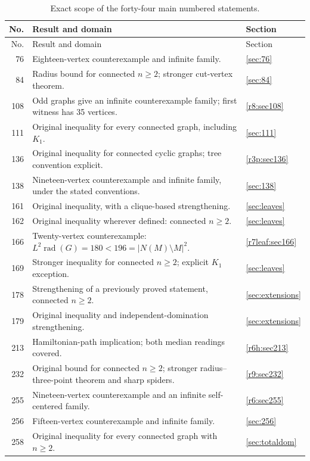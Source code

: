 \documentclass[11pt,a4paper]{article}
\theoremstyle{remark}
\newcommand{\rad}{\operatorname{rad}}
\begin{document}
\begin{longtable}{@{}r p{10.5cm} l@{}}
\caption{Exact scope of the forty-four main numbered statements.}
\label{tab:scope}\\
\toprule No. & Result and domain & Section\\\midrule
\endfirsthead
\toprule No. & Result and domain & Section\\\midrule
\endhead
76 & Eighteen-vertex counterexample and infinite family. & \ref{sec:76}\\
84 & Radius bound for connected $n\ge2$; stronger cut-vertex theorem. & \ref{sec:84}\\
108 & Odd graphs give an infinite counterexample family; first witness has 35 vertices. & \ref{r8:sec108}\\
111 & Original inequality for every connected graph, including $K_1$. & \ref{sec:111}\\
136 & Original inequality for connected cyclic graphs; tree convention explicit. & \ref{r3p:sec136}\\
138 & Nineteen-vertex counterexample and infinite family, under the stated conventions. & \ref{sec:138}\\
161 & Original inequality, with a clique-based strengthening. & \ref{sec:leaves}\\
162 & Original inequality wherever defined: connected $n\ge2$. & \ref{sec:leaves}\\
166 & Twenty-vertex counterexample: $L^2\rad(G)=180<196=|N(M)\setminus M|^2$. & \ref{r7leaf:sec166}\\
169 & Stronger inequality for connected $n\ge2$; explicit $K_1$ exception. & \ref{sec:leaves}\\
178 & Strengthening of a previously proved statement, connected $n\ge2$. & \ref{sec:extensions}\\
179 & Original inequality and independent-domination strengthening. & \ref{sec:extensions}\\
213 & Hamiltonian-path implication; both median readings covered. & \ref{r6h:sec213}\\
232 & Original bound for connected $n\ge2$; stronger radius--three-point theorem and sharp spiders. & \ref{r9:sec232}\\
255 & Nineteen-vertex counterexample and an infinite self-centered family. & \ref{r6:sec255}\\
256 & Fifteen-vertex counterexample and infinite family. & \ref{sec:256}\\
258 & Original inequality for every connected graph with $n\ge2$. & \ref{sec:totaldom}\\

\end{longtable}
\end{document}
